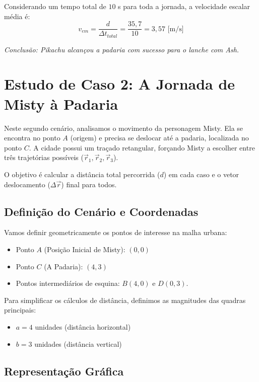 \documentclass[11pt,a4paper]{article}
\begin{document}
Considerando um tempo total de $10$ s para toda a jornada, a velocidade escalar média é:
$$v_{em} = \frac{d}{\Delta t_{total}} = \frac{35,7}{10} = 3,57 \text{ [m/s]}$$

\vfill
\begin{center}
    \textit{Conclusão: Pikachu alcançou a padaria com sucesso para o lanche com Ash.}
\end{center}


\section{Estudo de Caso 2: A Jornada de Misty à Padaria}

Neste segundo cenário, analisamos o movimento da personagem Misty. Ela se encontra no ponto $A$ (origem) e precisa se deslocar até a padaria, localizada no ponto $C$. A cidade possui um traçado retangular, forçando Misty a escolher entre três trajetórias possíveis ($\vec{r}_1, \vec{r}_2, \vec{r}_3$).

O objetivo é calcular a distância total percorrida ($d$) em cada caso e o vetor deslocamento ($\Delta \vec{r}$) final para todos.

\subsection{Definição do Cenário e Coordenadas}

Vamos definir geometricamente os pontos de interesse na malha urbana:
\begin{itemize}
    \item Ponto $A$ (Posição Inicial de Misty): $(0, 0)$
    \item Ponto $C$ (A Padaria): $(4, 3)$
    \item Pontos intermediários de esquina: $B(4, 0)$ e $D(0, 3)$.
\end{itemize}

Para simplificar os cálculos de distância, definimos as magnitudes das quadras principais:
\begin{itemize}
    \item $a = 4$ unidades (distância horizontal)
    \item $b = 3$ unidades (distância vertical)
\end{itemize}

\subsection{Representação Gráfica}
\end{document}
